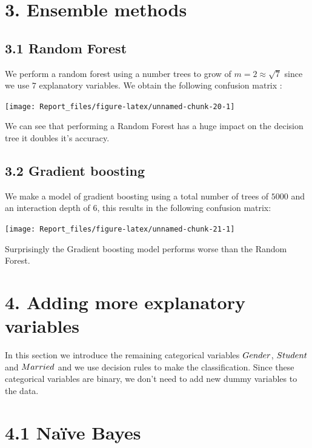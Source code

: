 \documentclass[]{article}
\begin{document}
\section{3. Ensemble methods}\label{ensemble-methods}

\subsection{3.1 Random Forest}\label{random-forest}

We perform a random forest using a number trees to grow of
\(m=2 \approx \sqrt{7}\) since we use \(7\) explanatory variables. We
obtain the following confusion matrix :

\begin{center}\texttt{[image: Report\_files/figure-latex/unnamed-chunk-20-1]} \end{center}

We can see that performing a Random Forest has a huge impact on the
decision tree it doubles it's accuracy.

\subsection{3.2 Gradient boosting}\label{gradient-boosting}

We make a model of gradient boosting using a total number of trees of
\(5000\) and an interaction depth of \(6\), this results in the
following confusion matrix:

\begin{center}\texttt{[image: Report\_files/figure-latex/unnamed-chunk-21-1]} \end{center}

Surprisingly the Gradient boosting model performs worse than the Random
Forest.

\section{4. Adding more explanatory
variables}\label{adding-more-explanatory-variables}

In this section we introduce the remaining categorical variables
\(Gender \space\), \(Student \space\) and \(Married \space\) and we use
decision rules to make the classification. Since these categorical
variables are binary, we don't need to add new dummy variables to the
data.

\section{4.1 Naïve Bayes}\label{naive-bayes}
\end{document}
